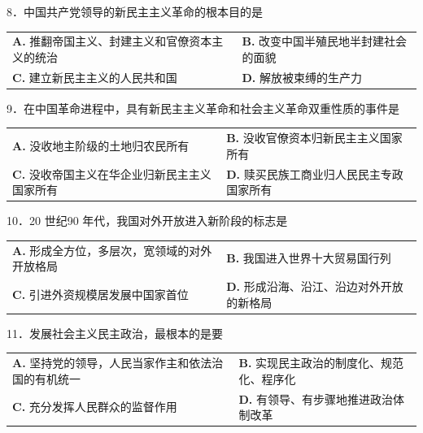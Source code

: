 \documentclass[UTF8,11pt]{ctexart}
\begin{document}
8．中国共产党领导的新民主主义革命的根本目的是


\begin{center}\begin{tabular}{>{\raggedright\arraybackslash}p{\dimexpr(\linewidth-4\tabcolsep)/2\relax}>{\raggedright\arraybackslash}p{\dimexpr(\linewidth-4\tabcolsep)/2\relax}}
\textbf{A.} 推翻帝国主义、封建主义和官僚资本主义的统治 & \textbf{B.} 改变中国半殖民地半封建社会的面貌\\[.35em]
\textbf{C.} 建立新民主主义的人民共和国 & \textbf{D.} 解放被束缚的生产力\\[.35em]\end{tabular}\end{center}

9．在中国革命进程中，具有新民主主义革命和社会主义革命双重性质的事件是


\begin{center}\begin{tabular}{>{\raggedright\arraybackslash}p{\dimexpr(\linewidth-4\tabcolsep)/2\relax}>{\raggedright\arraybackslash}p{\dimexpr(\linewidth-4\tabcolsep)/2\relax}}
\textbf{A.} 没收地主阶级的土地归农民所有 & \textbf{B.} 没收官僚资本归新民主主义国家所有\\[.35em]
\textbf{C.} 没收帝国主义在华企业归新民主主义国家所有 & \textbf{D.} 赎买民族工商业归人民民主专政国家所有\\[.35em]\end{tabular}\end{center}

10．20 世纪90 年代，我国对外开放进入新阶段的标志是


\begin{center}\begin{tabular}{>{\raggedright\arraybackslash}p{\dimexpr(\linewidth-4\tabcolsep)/2\relax}>{\raggedright\arraybackslash}p{\dimexpr(\linewidth-4\tabcolsep)/2\relax}}
\textbf{A.} 形成全方位，多层次，宽领域的对外开放格局 & \textbf{B.} 我国进入世界十大贸易国行列\\[.35em]
\textbf{C.} 引进外资规模居发展中国家首位 & \textbf{D.} 形成沿海、沿江、沿边对外开放的新格局\\[.35em]\end{tabular}\end{center}

11．发展社会主义民主政治，最根本的是要


\begin{center}\begin{tabular}{>{\raggedright\arraybackslash}p{\dimexpr(\linewidth-4\tabcolsep)/2\relax}>{\raggedright\arraybackslash}p{\dimexpr(\linewidth-4\tabcolsep)/2\relax}}
\textbf{A.} 坚持党的领导，人民当家作主和依法治国的有机统一 & \textbf{B.} 实现民主政治的制度化、规范化、程序化\\[.35em]
\textbf{C.} 充分发挥人民群众的监督作用 & \textbf{D.} 有领导、有步骤地推进政治体制改革\\[.35em]\end{tabular}\end{center}
\end{document}
